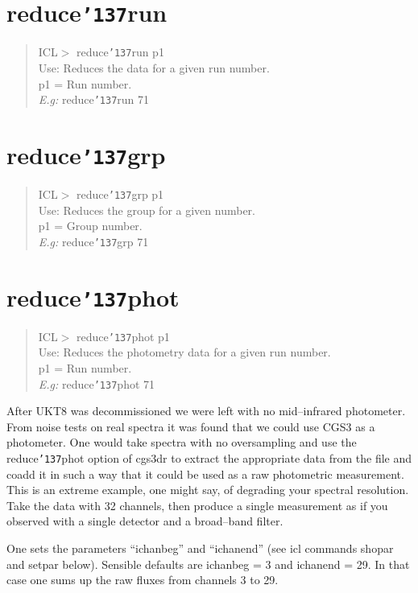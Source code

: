 \documentclass[a4paper]{book}
\renewcommand{\_}{{\tt\char'137}}
\begin{document}
\section{reduce\_run}
\begin{quote}
ICL$>$ reduce\_run p1 \\
Use: Reduces the data for a given run number. \\
p1 = Run number. \\
{\em E.g:} reduce\_run 71
\end{quote}

\section{reduce\_grp}
\begin{quote}
ICL$>$ reduce\_grp p1 \\
Use: Reduces the group for a given number. \\
p1 = Group number. \\
{\em E.g:} reduce\_grp 71
\end{quote}

\section{reduce\_phot}
\begin{quote}
ICL$>$ reduce\_phot p1 \\
Use: Reduces the photometry data for a given run number. \\
p1 = Run number. \\
{\em E.g:} reduce\_phot 71
\end{quote}

After UKT8 was decommissioned we were left with no mid--infrared
photometer.  From noise tests on real spectra it was found that we
could use CGS3 as a photometer.  One would take spectra with no
oversampling and use the reduce\_phot option of cgs3dr to extract
the appropriate data from the file and coadd it in such a way that it
could be used as a raw photometric measurement.  This is an extreme
example, one might say, of degrading your spectral resolution.  Take
the data with 32 channels, then produce a single measurement as if
you observed with a single detector and a broad--band filter.

One sets the parameters
``ichanbeg'' and ``ichanend'' (see icl commands shopar and setpar below).
Sensible defaults are ichanbeg = 3 and ichanend = 29.  In that case one
sums up the raw fluxes from channels 3 to 29.  
\end{document}

